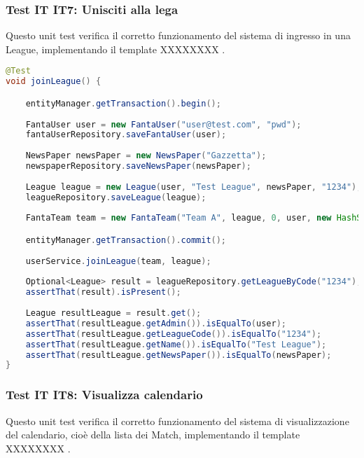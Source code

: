 \subsubsection{Test IT IT7: Unisciti alla lega} \label{IT7}

Questo unit test verifica il corretto funzionamento del sistema di ingresso in una League,
implementando il template XXXXXXXX .

\begin{lstlisting}[language=Java]
@Test
void joinLeague() {

	entityManager.getTransaction().begin();
	
	FantaUser user = new FantaUser("user@test.com", "pwd");
	fantaUserRepository.saveFantaUser(user);
		
	NewsPaper newsPaper = new NewsPaper("Gazzetta");
	newspaperRepository.saveNewsPaper(newsPaper);
		
	League league = new League(user, "Test League", newsPaper, "1234");
	leagueRepository.saveLeague(league);
		
	FantaTeam team = new FantaTeam("Team A", league, 0, user, new HashSet<Contract>());

	entityManager.getTransaction().commit();
		
	userService.joinLeague(team, league);
		
	Optional<League> result = leagueRepository.getLeagueByCode("1234");
	assertThat(result).isPresent();
		
	League resultLeague = result.get();
	assertThat(resultLeague.getAdmin()).isEqualTo(user);
	assertThat(resultLeague.getLeagueCode()).isEqualTo("1234");
	assertThat(resultLeague.getName()).isEqualTo("Test League");
	assertThat(resultLeague.getNewsPaper()).isEqualTo(newsPaper);
}
\end{lstlisting}


\subsubsection{Test IT IT8: Visualizza calendario} \label{IT8}

Questo unit test verifica il corretto funzionamento del sistema di visualizzazione del calendario, cioè della lista dei Match,
implementando il template XXXXXXXX .

